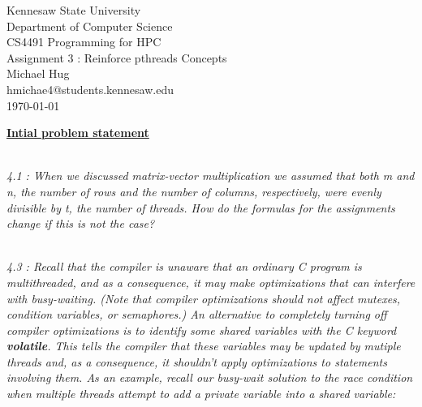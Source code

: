 \documentclass{article}
\begin{document}
\pagestyle{empty} 

\begin{titlepage}

\begin{center}

\LARGE

\vspace*{\fill}
Kennesaw State University \\
\vspace*{\fill}
Department of Computer Science \\
\vspace*{\fill}
CS4491 Programming for HPC \\
\vspace*{\fill}
Assignment 3 : Reinforce pthreads Concepts \\
\vspace*{\fill}
Michael Hug \\
\vspace*{\fill}
hmichae4@students.kennesaw.edu \\
\vspace*{\fill}
\today \\
\vspace*{\fill}

\normalsize

\end{center}

\end{titlepage}

\noindent \textbf{\underline{Intial problem statement}}

\emph
{
	\\4.1 : When we discussed matrix-vector multiplication we assumed that both m and
	n, the number of rows and the number of columns, respectively, were evenly
	divisible by t, the number of threads. How do the formulas for the assignments
	change if this is not the case?
} 

\bigskip

\emph
{
	\\4.3 : Recall that the compiler is unaware that an ordinary C program is
	multithreaded, and as a consequence, it may make optimizations that can
	interfere with busy-waiting. (Note that compiler optimizations should not affect
	mutexes, condition variables, or semaphores.) An alternative to completely
	turning off compiler optimizations is to identify some shared variables with
	the C keyword {\bfseries{volatile}}. This tells the compiler that these variables may be
	updated by mutiple threads and, as a consequence, it shouldn’t apply 
	optimizations to statements involving them. As an example, recall our busy-wait
	solution to the race condition when multiple threads attempt to add a private
	variable into a shared variable:
} 
\end{document}
